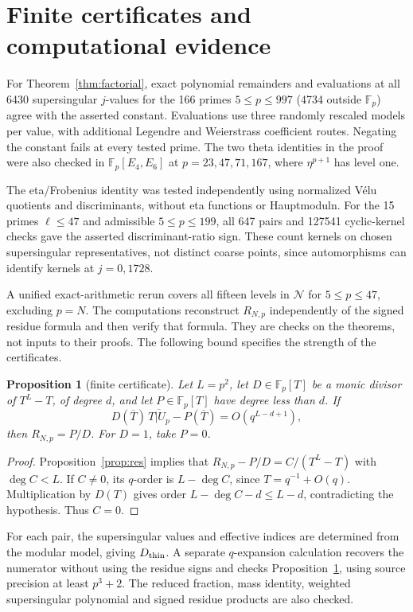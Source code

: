 \documentclass[11pt,a4paper]{article}
\numberwithin{equation}{section}
\newtheorem{proposition}[theorem]{Proposition}
\theoremstyle{definition}
\theoremstyle{remark}
\newcommand{\Fp}{\mathbb F_p}
\begin{document}
\section{Finite certificates and computational evidence}\label{sec:comp}
For Theorem~\ref{thm:factorial}, exact polynomial remainders and evaluations
at all 6430 supersingular $j$-values for the 166 primes $5\le p\le997$
(4734 outside $\Fp$) agree with the asserted constant. Evaluations use three
randomly rescaled models per value, with additional Legendre and Weierstrass
coefficient routes. Negating the constant fails at every tested prime.
The two theta identities in the proof were also checked in
$\Fp[E_4,E_6]$ at $p=23,47,71,167$, where $\eta^{p+1}$ has level one.

The eta/Frobenius identity was tested independently using normalized
V\'elu quotients and discriminants, without eta functions or Hauptmoduln.
For the 15 primes $\ell\le47$ and admissible $5\le p\le199$, all 647 pairs
and 127541 cyclic-kernel checks gave the asserted discriminant-ratio sign.
These count kernels on chosen supersingular representatives, not distinct
coarse points, since automorphisms can identify kernels at $j=0,1728$.


A unified exact-arithmetic rerun covers all fifteen levels in $\mathcal N$
for $5\le p\le47$, excluding $p=N$. The computations reconstruct
$R_{N,p}$ independently of the signed residue formula and then verify
that formula. They are checks on the theorems, not inputs to their proofs.
The following bound specifies the strength of the certificates.

\begin{proposition}[finite certificate]\label{prop:certificate}
Let $L=p^2$, let $D\in\Fp[T]$ be a monic divisor of $T^L-T$, of degree $d$, and
let $P\in\Fp[T]$ have degree less than $d$. If
\[
D(\overline T)\,\overline{T|U_p}-P(\overline T)=O(q^{L-d+1}),
\]
then $R_{N,p}=P/D$. For $D=1$, take $P=0$.
\end{proposition}
\begin{proof}
Proposition~\ref{prop:res} implies that
$R_{N,p}-P/D=C/(T^L-T)$ with $\deg C<L$.
If $C\ne0$, its $q$-order is $L-\deg C$, since $T=q^{-1}+O(q)$.
Multiplication by $D(T)$ gives order $L-\deg C-d\le L-d$, contradicting the
hypothesis. Thus $C=0$.
\end{proof}

For each pair, the supersingular values and effective indices are determined
from the modular model, giving $D_{\rm thin}$. A separate $q$-expansion
calculation recovers the numerator without using the residue signs and
checks Proposition~\ref{prop:certificate}, using source precision at least
$p^3+2$. The reduced fraction, mass identity, weighted supersingular
polynomial and signed residue products are also checked.
\end{document}
